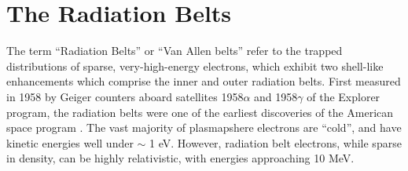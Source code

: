 %
%
%
%

\section{The Radiation Belts}
The term ``Radiation Belts'' or ``Van Allen belts'' refer to the trapped distributions of sparse, very-high-energy electrons, which exhibit two shell-like enhancements which comprise the inner and outer radiation belts. First measured in 1958 by Geiger counters aboard satellites 1958$\alpha$ and 1958$\gamma$ of the Explorer program, the radiation belts were one of the earliest discoveries of the American space program \citep{VanAllen1958}. The vast majority of plasmapshere electrons are ``cold'', and have kinetic energies well under $\sim$ 1 eV. However, radiation belt electrons, while sparse in density, can be highly relativistic, with energies approaching 10 MeV.

